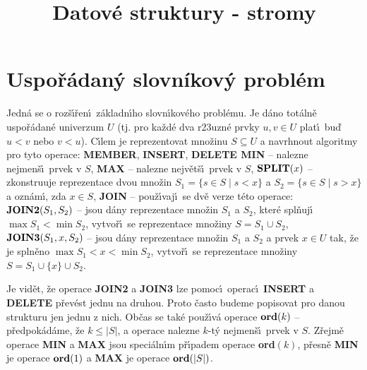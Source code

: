 \documentclass[a4paper,12pt]{article}
\def \emph#1{\underbar{#1}}
\DeclareMathOperator*{\Prob}{Prob}
\begin{document}
     

\newtheorem*{dusledek}{Důsledek}
\newtheorem*{lemma}{Lemma}
\newtheorem*{veta}{Věta}
\newtheorem*{tvrzeni}{Tvrzení}
\newtheorem*{definice}{Definice}


\def \emph#1{\underbar{#1}}
\def \Prob{\operatorname{Prob}}
\def \var{\operatorname{var}}

\title{Datové struktury - stromy}
\date{}
\maketitle

\tableofcontents


\section{Uspořádaný slovníkový problém}

\flushpar Jedn\'a se o roz\v s\'\i\v ren\'\i\ z\'akladn\'\i ho slovn\'\i kov\'eho probl\'emu. Je 
d\'ano tot\'aln\v e uspo\v r\'adan\'e univerzum $U$ (tj. pro ka\v zd\'e dva 
r\accent23uzn\'e prvky $u,v\in U$ plat\'\i\ bu\v d $u<v$ nebo $v<
u$). C\'\i lem 
je reprezentovat 
mno\v zinu $S\subseteq U$ a navrhnout algoritmy pro tyto operace:\newline 
{\bf MEMBER}, {\bf INSERT}, {\bf DELETE\newline 
MIN} -- nalezne nejmen\v s\'\i\ prvek v $S$,\newline 
{\bf MAX} -- nalezne nejv\v et\v s\'\i\ prvek v $S$,\newline 
$\bold S\bold P\bold L\bold I\bold T(x)$ -- zkonstruuje reprezentace dvou mno\v zin 
$S_1=\{s\in S\mid s<x\}$ a $S_2=\{s\in S\mid s>x\}$ a ozn\'am\'\i , zda 
$x\in S$,\newline 
{\bf JOIN} -- pou\v z\'\i vaj\'\i\ se dv\v e verze t\'eto operace:\newline 
$\bold J\bold O\bold I\bold N\bold 2(S_1,S_2)$ -- jsou d\'any reprezentace mno\v zin $
S_1$ a $S_2$, kter\'e 
spl\v nuj\'\i\ $\max S_1<\min S_2$, vytvo\v r\'\i\ se reprezentace mno\v ziny 
$S=S_1\cup S_2$,\newline 
$\bold J\bold O\bold I\bold N\bold 3(S_1,x,S_2)$ -- jsou d\'any reprezentace mno\v zin $
S_1$ a $S_2$ a 
prvek $x\in U$ tak, \v ze je spln\v eno $\max S_1<x<\min S_2$, vytvo\v r\'\i\ 
se reprezentace mno\v ziny $S=S_1\cup \{x\}\cup S_2$.
\smallskip

\flushpar Je vid\v et, \v ze operace {\bf JOIN2} a {\bf JOIN3} lze pomoc\'\i\ ope\-rac\'\i\ 
{\bf INSERT} a {\bf DELETE} p\v rev\'est jednu na druhou. Proto \v casto budeme 
popisovat pro danou strukturu jen jednu z nich. 
Ob\v cas se tak\'e pou\v z\'\i v\'a operace\newline 
$\bold o\bold r\bold d(k)$ -- p\v redpok\'ad\'ame, \v ze $k\le |S
|$, a operace nalezne $k$-t\'y 
nejmen\v s\'\i\ prvek v $S$.\newline 
Z\v rejm\v e operace {\bf MIN} a {\bf MAX} jsou speci\'aln\'\i m p\v r\'\i padem 
ope\-race {\bf ord$(k)$}, 
p\v resn\v e {\bf MIN} je operace $\bold o\bold r\bold d(1)$ a {\bf MAX} je operace $
\bold o\bold r\bold d(|S|)$.
\end{document}
